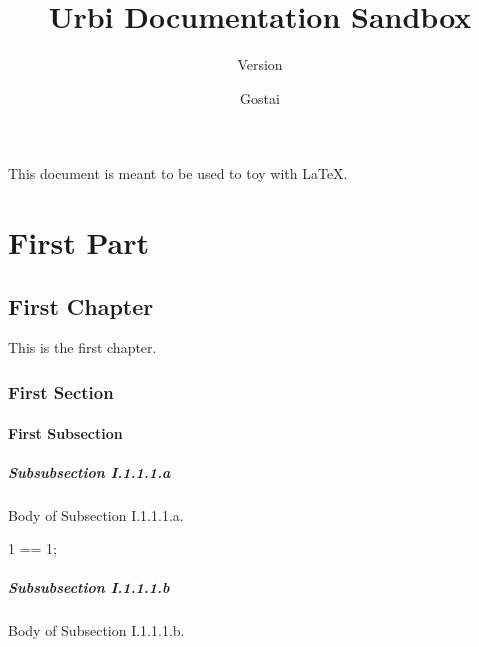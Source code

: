 \documentclass[openright,twoside,11pt]{book}
\title{Urbi Documentation Sandbox}
\subtitle{Version \VcsDescription}
\author{Gostai}
\begin{document}
\NewSection\faqsection {\thesubsubsection}

  {}
  {}
  {\addtocounter{subsubsection}{1}%
    \thesubsubsection   {}}
  {}

  {}
  { } %
  {} %
  {}


\maketitle

This document is meant to be used to toy with \LaTeX{}.

\tableofcontents
\part{First Part}
\chapter{First Chapter}

This is the first chapter.

\section{First Section}

\subsection{First Subsection}
\subsubsection{Subsubsection I.1.1.1.a}
Body of Subsection I.1.1.1.a.

\begin{urbiassert}[firstnumber=1]
1 == 1;
\end{urbiassert}

\subsubsection{Subsubsection I.1.1.1.b}
Body of Subsection I.1.1.1.b.
\end{document}
